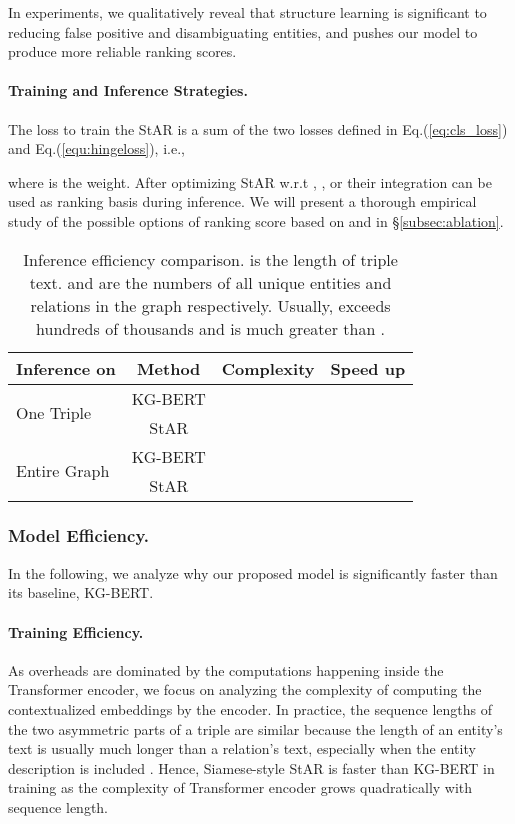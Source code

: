 \documentclass[sigconf]{acmart}
\begin{document}
In experiments, we qualitatively reveal that structure learning is significant to reducing false positive and disambiguating entities, and pushes our model to produce more reliable ranking scores. 


\paragraph{Training and Inference Strategies.}
The loss  to train the StAR is a sum of the two losses defined in Eq.(\ref{eq:cls_loss}) and Eq.(\ref{equ:hingeloss}), i.e., 

where  is the weight.
After optimizing StAR w.r.t , ,  or their integration can be used as ranking basis during inference. We will present a thorough empirical study of the possible options of ranking score based on  and  in \S\ref{subsec:ablation}. 


\begin{table}[t] \small
\caption{\small Inference efficiency comparison.  is the length of triple text.  and  are the numbers of all unique entities and relations in the graph respectively. Usually,  exceeds hundreds of thousands and is much greater than . }
\setlength{\tabcolsep}{1pt}
    \centering
    \begin{tabular}{l|ccc}
        \hline
        \textbf{Inference on}  & \textbf{Method}  & \textbf{Complexity}  & \textbf{Speed up} \\
        \hline
        \multirow{2}{*}{One Triple}   & KG-BERT   &   & \multirow{2}{*}{} \\
         ~      & StAR     &   &  \\
         \hline
         \multirow{2}{*}{Entire Graph} & KG-BERT   &   & \multirow{2}{*}{}\\
         ~      & StAR     &    &  \\
         \hline
    \end{tabular}
    \label{tab:efficiency}
\end{table}

\subsubsection{Model Efficiency.} \label{subsubsec:efficiency}

In the following, we analyze why our proposed model is significantly faster than its baseline, KG-BERT.

\paragraph{Training Efficiency.} 
As overheads are dominated by the computations happening inside the Transformer encoder, we focus on analyzing the complexity of computing the contextualized embeddings by the encoder. 
In practice, the sequence lengths of the two asymmetric parts of a triple are similar because the length of an entity's text is usually much longer than a relation's text, especially when the entity description is included \cite{xiao2017ssp,yao2019kgbert}. 
Hence, Siamese-style StAR is  faster than KG-BERT in training as the complexity of Transformer encoder grows quadratically with sequence length. 
\end{document}
